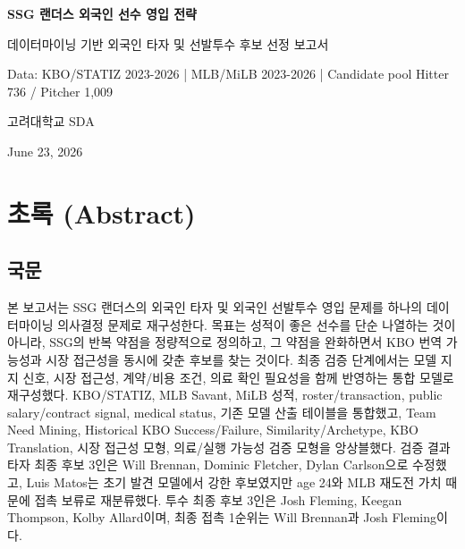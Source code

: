 \documentclass[11pt,a4paper]{article}
\begin{document}
\begin{titlepage}
    \centering
    \vspace*{42mm}
    {\Huge\bfseries SSG 랜더스 외국인 선수 영입 전략\par}
    \vspace{9mm}
    {\Large 데이터마이닝 기반 외국인 타자 및 선발투수 후보 선정 보고서\par}
    \vspace{14mm}
    {\large Data: KBO/STATIZ 2023-2026 \quad | \quad MLB/MiLB 2023-2026 \quad | \quad Candidate pool Hitter 736 / Pitcher 1,009\par}
    \vfill
    {\large 고려대학교 SDA\par}
    \vspace{6mm}
    {\large June 23, 2026\par}
\end{titlepage}


\section*{초록 (Abstract)}

\subsection*{국문}
본 보고서는 SSG 랜더스의 외국인 타자 및 외국인 선발투수 영입 문제를 하나의 데이터마이닝 의사결정 문제로 재구성한다. 목표는 성적이 좋은 선수를 단순 나열하는 것이 아니라, SSG의 반복 약점을 정량적으로 정의하고, 그 약점을 완화하면서 KBO 번역 가능성과 시장 접근성을 동시에 갖춘 후보를 찾는 것이다. 최종 검증 단계에서는 모델 지지 신호, 시장 접근성, 계약/비용 조건, 의료 확인 필요성을 함께 반영하는 통합 모델로 재구성했다. KBO/STATIZ, MLB Savant, MiLB 성적, roster/transaction, public salary/contract signal, medical status, 기존 모델 산출 테이블을 통합했고, Team Need Mining, Historical KBO Success/Failure, Similarity/Archetype, KBO Translation, 시장 접근성 모형, 의료/실행 가능성 검증 모형을 앙상블했다. 검증 결과 타자 최종 후보 3인은 Will Brennan, Dominic Fletcher, Dylan Carlson으로 수정했고, Luis Matos는 초기 발견 모델에서 강한 후보였지만 age 24와 MLB 재도전 가치 때문에 접촉 보류로 재분류했다. 투수 최종 후보 3인은 Josh Fleming, Keegan Thompson, Kolby Allard이며, 최종 접촉 1순위는 Will Brennan과 Josh Fleming이다.
\end{document}

